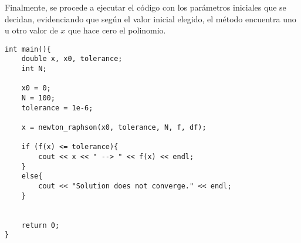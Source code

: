 \documentclass[10pt]{article}
\begin{document}
    Finalmente, se procede a ejecutar el código con los parámetros iniciales que se decidan, evidenciando que según el valor inicial elegido, el método encuentra uno u otro valor de $x$ que hace cero el polinomio.
    
    \begin{verbatim}
int main(){
    double x, x0, tolerance;
    int N;

    x0 = 0;
    N = 100;
    tolerance = 1e-6;

    x = newton_raphson(x0, tolerance, N, f, df);

    if (f(x) <= tolerance){
        cout << x << " --> " << f(x) << endl;
    }
    else{
        cout << "Solution does not converge." << endl;
    }


    return 0;
}
    \end{verbatim}
    
    
\end{document}

